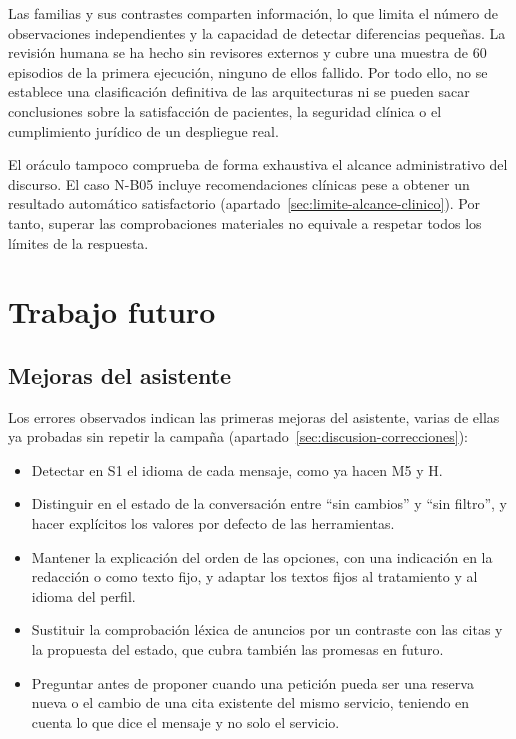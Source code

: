 Las familias y sus contrastes comparten información, lo que limita el número
de observaciones independientes y la capacidad de detectar diferencias
pequeñas. La revisión humana se ha hecho sin revisores externos y cubre una
muestra de 60 episodios de la primera ejecución, ninguno de ellos fallido. Por todo
ello, no se establece una clasificación definitiva de las arquitecturas ni se
pueden sacar conclusiones sobre la satisfacción de pacientes, la seguridad
clínica o el cumplimiento jurídico de un despliegue real.

El oráculo tampoco comprueba de forma exhaustiva el alcance administrativo del
discurso. El caso N-B05 incluye recomendaciones clínicas pese a obtener un
resultado automático satisfactorio (apartado~\ref{sec:limite-alcance-clinico}).
Por tanto, superar las comprobaciones materiales no equivale a respetar todos
los límites de la respuesta.

\section{Trabajo futuro}

\subsection{Mejoras del asistente}

Los errores observados indican las primeras mejoras del asistente, varias de
ellas ya probadas sin repetir la campaña (apartado~\ref{sec:discusion-correcciones}):

\begin{itemize}
  \item Detectar en S1 el idioma de cada mensaje, como ya hacen M5 y H.
  \item Distinguir en el estado de la conversación entre \enquote{sin cambios}
        y \enquote{sin filtro}, y hacer explícitos los valores por defecto de
        las herramientas.
  \item Mantener la explicación del orden de las opciones, con una indicación
        en la redacción o como texto fijo, y adaptar los textos fijos al
        tratamiento y al idioma del perfil.
  \item Sustituir la comprobación léxica de anuncios por un contraste con las
        citas y la propuesta del estado, que cubra también las promesas en
        futuro.
  \item Preguntar antes de proponer cuando una petición pueda ser una reserva
        nueva o el cambio de una cita existente del mismo servicio, teniendo en
        cuenta lo que dice el mensaje y no solo el servicio.
\end{itemize}

